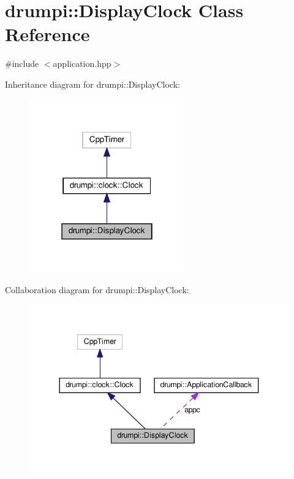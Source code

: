 \hypertarget{classdrumpi_1_1DisplayClock}{}\section{drumpi\+:\+:Display\+Clock Class Reference}
\label{classdrumpi_1_1DisplayClock}


{\ttfamily \#include $<$application.\+hpp$>$}



Inheritance diagram for drumpi\+:\+:Display\+Clock\+:
\nopagebreak
\begin{figure}[H]
\begin{center}
\leavevmode
\includegraphics[width=190pt]{classdrumpi_1_1DisplayClock__inherit__graph}
\end{center}
\end{figure}


Collaboration diagram for drumpi\+:\+:Display\+Clock\+:
\nopagebreak
\begin{figure}[H]
\begin{center}
\leavevmode
\includegraphics[width=344pt]{classdrumpi_1_1DisplayClock__coll__graph}
\end{center}
\end{figure}
